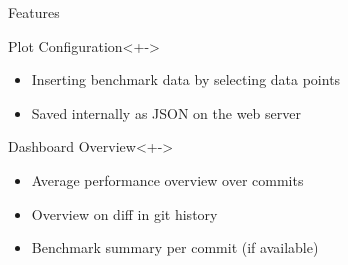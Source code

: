 
\begin{frame}{Features}
  \begin{block}{Plot Configuration}<+->
    \begin{itemize}[<+->]
       \item Inserting benchmark data by selecting data points
       \item Saved internally as JSON on the web server
    \end{itemize}
  \end{block}
  \begin{block}{Dashboard Overview}<+->
    \begin{itemize}[<+->]
       \item Average performance overview over commits
       \item Overview on diff in git history
       \item Benchmark summary per commit (if available)
    \end{itemize}
  \end{block}
  \onslide<+->
\end{frame}